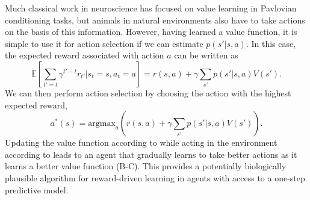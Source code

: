 Much classical work in neuroscience has focused on value learning in Pavlovian conditioning tasks, but animals in natural environments also have to take actions on the basis of this information.
However, having learned a value function, it is simple to use it for action selection if we can estimate $p(s' | s, a)$.
In this case, the expected reward associated with action $a$ can be written as
\begin{equation}
    \mathbb{E} \left [\sum_{t' = t} \gamma^{t'-t} r_{t'} | s_t = s, a_t = a \right ] = r(s, a) + \gamma \sum_{s'} p( s' | s, a) V(s').
\end{equation}
We can then perform action selection by choosing the action with the highest expected reward,
\begin{equation}
    \label{eq:value_action_selection}
    a^*(s) = \text{argmax}_{a} \left ( r(s, a) + \gamma \sum_{s'} p(s' | s, a) V(s') \right ).
\end{equation}
Updating the value function according to  while acting in the environment according to  leads to an agent that gradually learns to take better actions as it learns a better value function (B-C).
This provides a potentially biologically plausible algorithm for reward-driven learning in agents with access to a one-step predictive model.

